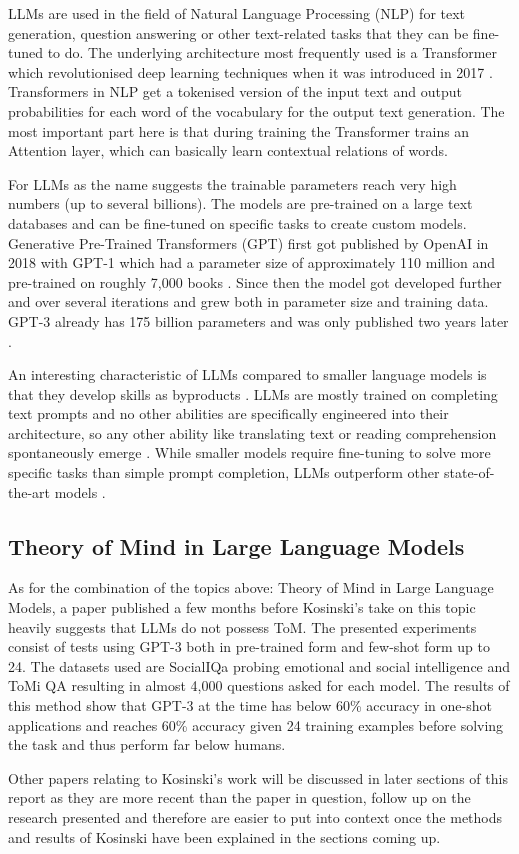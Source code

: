 LLMs are used in the field of Natural Language Processing (NLP) for text generation, question answering or other text-related tasks that they can be fine-tuned to do. The underlying architecture most frequently used is a Transformer which revolutionised deep learning techniques when it was introduced in 2017 \cite{attention}. Transformers in NLP get a tokenised version of the input text and output probabilities for each word of the vocabulary for the output text generation. The most important part here is that during training the Transformer trains an Attention layer, which can basically learn contextual relations of words.

For LLMs as the name suggests the trainable parameters reach very high numbers (up to several billions). The models are pre-trained on a large text databases and can be fine-tuned on specific tasks to create custom models. Generative Pre-Trained Transformers (GPT) first got published by OpenAI in 2018 with GPT-1 which had a parameter size of approximately 110 million and pre-trained on roughly 7,000 books \cite{gpt1}. Since then the model got developed further and over several iterations and grew both in parameter size and training data. GPT-3 already has 175 billion parameters and was only published two years later \cite{gpt3}.

An interesting characteristic of LLMs compared to smaller language models is that they develop skills as byproducts \cite{llms}. LLMs are mostly trained on completing text prompts and no other abilities are specifically engineered into their architecture, so any other ability like translating text or reading comprehension spontaneously emerge \cite{gpt3}. While smaller models require fine-tuning to solve more specific tasks than simple prompt completion, LLMs outperform other state-of-the-art models \cite{gpt3}.

\subsection{Theory of Mind in Large Language Models}
As for the combination of the topics above: Theory of Mind in Large Language Models, a paper published a few months before Kosinski's take on this topic heavily suggests that LLMs do not possess ToM. The presented experiments consist of tests using GPT-3 both in pre-trained form and few-shot form up to 24. The datasets used are SocialIQa probing emotional and social intelligence \cite{socialiqa} and ToMi QA \cite{tomi} resulting in almost 4,000 questions asked for each model. The results of this method show that GPT-3 at the time has below 60\% accuracy in one-shot applications and reaches 60\% accuracy given 24 training examples before solving the task and thus perform far below humans. \cite{related}

Other papers relating to Kosinski's work will be discussed in later sections of this report as they are more recent than the paper in question, follow up on the research presented and therefore are easier to put into context once the methods and results of Kosinski have been explained in the sections coming up.